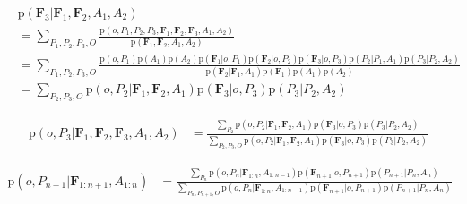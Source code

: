\documentclass[11pt]{article}
\newcommand{\SetOf}[1]{\mathbf{#1}} %
\newcommand{\prob}[1]{\text{p}(#1)} %
\newcommand{\Eq}[1]{\begin{align*}#1\end{align*}} %
\begin{document}
	\Eq{&\prob{\SetOf{F}_3|\SetOf{F}_1,\SetOf{F}_2,A_1,A_2} \\
	&= \sum_{P_1,P_2,P_3,O} \frac{\prob{o,P_1,P_2,P_3,\SetOf{F}_1,\SetOf{F}_2,\SetOf{F}_3,A_1,A_2}}{\prob{\SetOf{F}_1,\SetOf{F}_2,A_1,A_2}} \\ 
	&= \sum_{P_1,P_2,P_3,O} \frac{\prob{o,P_1}\prob{A_1}\prob{A_2}\prob{\SetOf{F}_1|o,P_1}\prob{\SetOf{F}_2|o,P_2}\prob{\SetOf{F}_3|o,P_3}\prob{P_2|P_1,A_1}\prob{P_3|P_2,A_2}}{ \prob{\SetOf{F}_2|\SetOf{F}_1,A_1} \prob{\SetOf{F}_1} \prob{A_1} \prob{A_2} } \\ 
	&= \sum_{P_2,P_3,O} \prob{o,P_2|\SetOf{F}_1,\SetOf{F}_2,A_1} \prob{\SetOf{F}_3|o,P_3}\prob{P_3|P_2,A_2}  }

	\Eq{\prob{o,P_3|\SetOf{F}_1,\SetOf{F}_2,\SetOf{F}_3,A_1,A_2} &= \frac{ \sum_{P_2} \prob{o,P_2|\SetOf{F}_1,\SetOf{F}_2,A_1} \prob{\SetOf{F}_3|o,P_3} \prob{P_3|P_2,A_2}}{\sum_{P_2,P_3,O} \prob{o,P_2|\SetOf{F}_1,\SetOf{F}_2,A_1} \prob{\SetOf{F}_3|o,P_3}\prob{P_3|P_2,A_2} } }

	\Eq{\prob{o,P_{n+1}|\SetOf{F}_{1:n+1},A_{1:n}} &= \frac{ \sum_{P_n} \prob{o,P_n|\SetOf{F}_{1:n},A_{1:n-1}} \prob{\SetOf{F}_{n+1}|o,P_{n+1}} \prob{P_{n+1}|P_n,A_n}}{\sum_{P_n,P_{n+1},O} \prob{o,P_n|\SetOf{F}_{1:n},A_{1:n-1}} \prob{\SetOf{F}_{n+1}|o,P_{n+1}} \prob{P_{n+1}|P_n,A_n}} }
\end{document}
